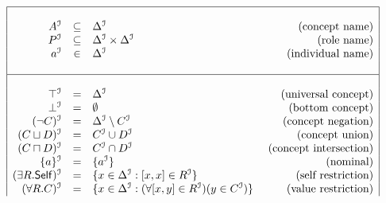\documentclass[a4paper,UKenglish]{lipics}
\newcommand{\selfrestriction}[1]{\exists #1.\mathsf{Self}}
\begin{document}
\begin{table}
\begin{math}
\begin{array}{|rclr|}
\hline
&&&\\
A^{\I} & \subseteq & \Delta^{\I} & \mbox{ (concept name)}\\
P^{\I} & \subseteq & \Delta^{\I} \times \Delta^{\I} & \mbox{ (role name)}\\
a^{\I} & \in & \Delta^{\I} & \mbox{ (individual name)}\\
&&&\\
\hline
&&&\\
\top^{\I}          & = & \Delta^{\I} & \mbox{ (universal concept)}\\
\bot^{\I}          & = & \emptyset & \mbox{ (bottom concept)}\\
(\neg C)^{\I} & = & \Delta^{\I} \setminus C^{\I} & \mbox{  (concept negation)}\\
(C \sqcup D)^{\I} & = & C^{\I} \cup D^{\I} & \mbox{ (concept union)}\\
(C \sqcap D)^{\I} & = & C^{\I} \cap D^{\I} & \mbox{ (concept intersection)}\\
\{a\}^{\I} & = & \{a^{\I}\} & \mbox{ (nominal)}\\
(\selfrestriction{R})^{\I} & = & \{x \in \Delta^{\I}: [x,x] \in R^{\I}\} & \mbox{ (self restriction)}\\

(\forall R.C)^{\I} & = &
\{x \in \Delta^{\I} : (\forall [x,y] \in R^{\I})(y \in C^{\I}) \}
& \mbox{ (value restriction)}\\


\end{array}
\end{math}
\end{table}
\end{document}
